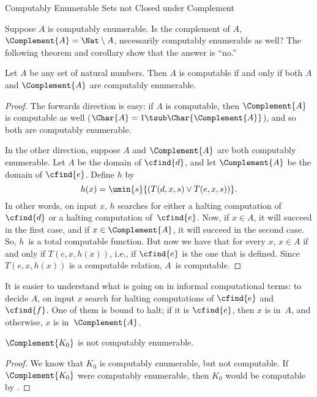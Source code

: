 \documentclass[../../../include/open-logic-section]{subfiles}
\begin{document}
  {Computably Enumerable Sets not Closed under Complement}

Suppose $A$ is computably enumerable. Is the complement of $A$,
$\Complement{A} = \Nat \setminus A$, necessarily computably enumerable
as well? The following theorem and corollary show that the answer is
``no.''

\begin{thm}
Let $A$ be any set of natural numbers. Then $A$ is computable if and
only if both $A$ and $\Complement{A}$ are computably enumerable.
\end{thm}

\begin{proof}
The forwards direction is easy: if $A$ is computable, then
$\Complement{A}$ is computable as well ($\Char{A} = 1 \tsub
\Char{\Complement{A}}$), and so both are computably enumerable.

In the other direction, suppose $A$ and $\Complement{A}$ are both
computably enumerable. Let $A$ be the domain of $\cfind{d}$, and let
$\Complement{A}$ be the domain of $\cfind{e}$. Define $h$ by
\[
h(x) = \umin{s}{(T(d,x,s) \lor T(e,x,s))}.
\]
In other words, on input $x$, $h$ searches for either a halting
computation of~$\cfind{d}$ or a halting computation
of~$\cfind{e}$. Now, if $x \in A$, it will succeed in the first case,
and if $x \in \Complement{A}$, it will succeed in the second case. So,
$h$~is a total computable function. But now we have that for every
$x$, $x \in A$ if and only if $T(e, x, h(x))$, i.e., if $\cfind{e}$ is
the one that is defined. Since $T(e, x, h(x))$ is a computable relation,
$A$~is computable.
\end{proof}

\begin{explain}
It is easier to understand what is going on in informal computational
terms: to decide $A$, on input $x$ search for halting computations of
$\cfind{e}$ and $\cfind{f}$. One of them is bound to halt; if it is $\cfind{e}$,
then $x$ is in~$A$, and otherwise, $x$ is in~$\Complement{A}$.
\end{explain}

\begin{cor}
$\Complement{K_0}$ is not computably enumerable.
\end{cor}

\begin{proof}
We know that $K_0$ is computably enumerable, but not computable. If
$\Complement{K_0}$ were computably enumerable, then $K_0$ would be
computable by .
\end{proof}
\end{document}
